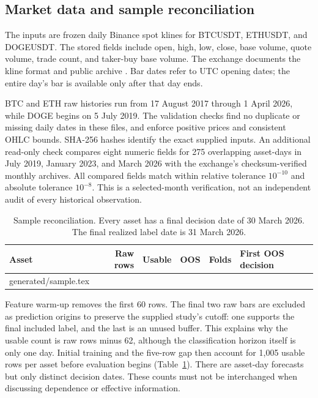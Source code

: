 \documentclass[preprint,12pt,authoryear]{elsarticle}
\makeatletter
\def\inputrows#1{\@@input #1 }
\makeatother
\begin{document}
\subsection{Market data and sample reconciliation}
The inputs are frozen daily Binance spot klines for BTCUSDT, ETHUSDT, and DOGEUSDT. The stored fields include open, high, low, close, base volume, quote volume, trade count, and taker-buy base volume. The exchange documents the kline format and public archive \citep{binance2026}. Bar dates refer to UTC opening dates; the entire day's bar is available only after that day ends.

BTC and ETH raw histories run from 17 August 2017 through 1 April 2026, while DOGE begins on 5 July 2019. The validation checks find no duplicate or missing daily dates in these files, and enforce positive prices and consistent OHLC bounds. SHA-256 hashes identify the exact supplied inputs. An additional read-only check compares eight numeric fields for 275 overlapping asset-days in July 2019, January 2023, and March 2026 with the exchange's checksum-verified monthly archives. All compared fields match within relative tolerance $10^{-10}$ and absolute tolerance $10^{-8}$. This is a selected-month verification, not an independent audit of every historical observation.

\begin{table}[htbp]
\centering\small
\caption{Sample reconciliation. Every asset has a final decision date of 30 March 2026. The final realized label date is 31 March 2026.}\label{tab:sample}
\begin{tabular}{lrrrrl}\toprule
Asset & Raw rows & Usable & OOS & Folds & First OOS decision\\\midrule
\inputrows{generated/sample.tex}
\bottomrule\end{tabular}
\end{table}

Feature warm-up removes the first 60 rows. The final two raw bars are excluded as prediction origins to preserve the supplied study's cutoff: one supports the final included label, and the last is an unused buffer. This explains why the usable count is raw rows minus 62, although the classification horizon itself is only one day. Initial training and the five-row gap then account for 1,005 usable rows per asset before evaluation begins (Table~\ref{tab:sample}). There are \PredictionCount{} asset-day forecasts but only \PanelDays{} distinct decision dates. These counts must not be interchanged when discussing dependence or effective information.
\end{document}
